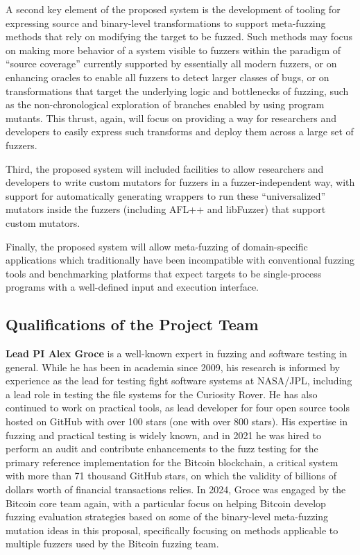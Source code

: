 A second key element of the proposed system is the development of tooling for 
expressing source and binary-level transformations to support meta-fuzzing 
methods that rely on modifying the target to be fuzzed.  Such methods may focus 
on making more behavior of a system visible to fuzzers within the paradigm of 
``source coverage'' currently supported by essentially all modern fuzzers, or 
on enhancing oracles to enable all fuzzers to detect larger classes of bugs, or 
on transformations that target the underlying logic and bottlenecks of fuzzing, 
such as the non-chronological exploration of branches enabled by using program 
mutants.  This thrust, again, will focus on providing a way for researchers and 
developers to easily express such transforms and deploy them across a large set 
of fuzzers.

Third, the proposed system will included facilities to allow researchers and developers to 
write custom mutators for fuzzers in a fuzzer-independent way, with support for 
automatically generating wrappers to run these ``universalized'' mutators 
inside the fuzzers (including AFL++ and libFuzzer) that 
support custom mutators.

Finally, the proposed system will allow meta-fuzzing of domain-specific applications
which traditionally have been incompatible with conventional fuzzing tools and
benchmarking platforms that expect targets to be single-process programs with
a well-defined input and execution interface.

\subsection{Qualifications of the Project Team}

{\bf Lead PI Alex Groce} is a well-known expert in fuzzing and software testing
in general. While he has been in academia since 2009, his research is informed
by experience as the lead for testing fight software systems at NASA/JPL,
including a lead role in testing the file systems for the Curiosity Rover. He
has also continued to work on practical tools, as lead developer for four open
source tools hosted on GitHub with over 100 stars (one with over 800
stars). His expertise in fuzzing and
practical testing is widely known, and in 2021 he was hired to perform an audit
and contribute enhancements to the fuzz testing for the primary reference
implementation for the Bitcoin blockchain, a critical system with more than 71
thousand GitHub stars, on which the validity of billions of dollars worth of
financial transactions relies.  In 2024, Groce was engaged by the
Bitcoin core team again, with a particular focus on helping Bitcoin
develop fuzzing evaluation strategies based on some of the
binary-level meta-fuzzing mutation ideas in this proposal,
specifically focusing on methods applicable to multiple fuzzers used
by the Bitcoin fuzzing team.

